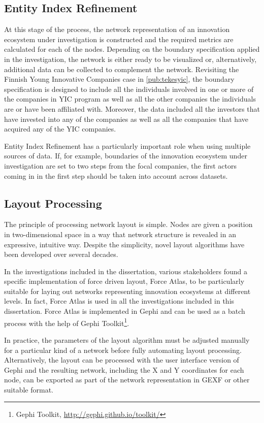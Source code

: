 \subsection{Entity Index Refinement}

At this stage of the process, the network representation of an innovation ecosystem under investigation is constructed and the required metrics are calculated for each of the nodes. Depending on the boundary specification applied in the investigation, the network is either ready to be visualized or, alternatively, additional data can be collected to complement the network. Revisiting the Finnish Young Innovative Companies case in \ref{pub:tekesyic}, the boundary specification is designed to include all the individuals involved in one or more of the companies in YIC program as well as all the other companies the individuals are or have been affiliated with. Moreover, the data included all the investors that have invested into any of the companies as well as all the companies that have acquired any of the YIC companies.

Entity Index Refinement has a particularly important role when using multiple sources of data. If, for example, boundaries of the innovation ecosystem under investigation are set to two steps from the focal companies, the first actors coming in in the first step should be taken into account across datasets.

\subsection{Layout Processing}

The principle of processing network layout is simple. Nodes are given a position in two-dimensional space in a way that network structure is revealed in an expressive, intuitive way. Despite the simplicity, novel layout algorithms have been developed over several decades.

In the investigations included in the dissertation, various stakeholders found a specific implementation of force driven layout, Force Atlas, to be particularly suitable for laying out networks representing innovation ecosystems at different levels. In fact, Force Atlas is used in all the investigations included in this dissertation. Force Atlas is implemented in Gephi \citep{Bastian2009Gephi:Networks} and can be used as a batch process with the help of Gephi Toolkit\footnote{Gephi Toolkit, \url{http://gephi.github.io/toolkit/}}. 

In practice, the parameters of the layout algorithm must be adjusted manually for a particular kind of a network before fully automating layout processing. Alternatively, the layout can be processed with the user interface version of Gephi and the resulting network, including the X and Y coordinates for each node, can be exported as part of the network representation in GEXF or other suitable format.

